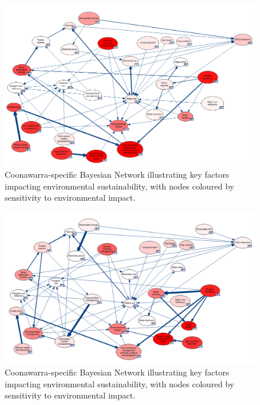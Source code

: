 \begin{figure}[h!]
    \centering
    \includegraphics[width=\linewidth]{robyn}
    \caption{Coonawarra-specific Bayesian Network illustrating key factors impacting environmental sustainability, with nodes coloured by sensitivity to environmental impact.}\label{fig:robyn}
\end{figure}

\begin{figure}[h!]
    \centering
    \includegraphics[width=\linewidth]{marcel}
    \caption{Coonawarra-specific Bayesian Network illustrating key factors impacting environmental sustainability, with nodes coloured by sensitivity to environmental impact.}\label{fig:marcel}
\end{figure}


